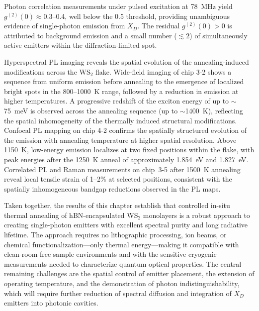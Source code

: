 Photon correlation measurements under pulsed excitation at 78~MHz yield $g^{(2)}(0) \approx 0.3$--0.4, well below the 0.5 threshold, providing unambiguous evidence of single-photon emission from $X_D$. The residual $g^{(2)}(0) > 0$ is attributed to background emission and a small number ($\lesssim 2$) of simultaneously active emitters within the diffraction-limited spot.

Hyperspectral PL imaging reveals the spatial evolution of the annealing-induced modifications across the WS$_2$ flake. Wide-field imaging of chip 3-2 shows a sequence from uniform emission before annealing to the emergence of localized bright spots in the 800--1000~K range, followed by a reduction in emission at higher temperatures. A progressive redshift of the exciton energy of up to $\sim$75~meV is observed across the annealing sequence (up to $\sim$1400~K), reflecting the spatial inhomogeneity of the thermally induced structural modifications. Confocal PL mapping on chip 4-2 confirms the spatially structured evolution of the emission with annealing temperature at higher spatial resolution. Above 1150~K, low-energy emission localizes at two fixed positions within the flake, with peak energies after the 1250~K anneal of approximately 1.854~eV and 1.827~eV. Correlated PL and Raman measurements on chip~3-5 after 1500~K annealing reveal local tensile strain of 1--2\% at selected positions, consistent with the spatially inhomogeneous bandgap reductions observed in the PL maps.

Taken together, the results of this chapter establish that controlled in-situ thermal annealing of hBN-encapsulated WS$_2$ monolayers is a robust approach to creating single-photon emitters with excellent spectral purity and long radiative lifetime. The approach requires no lithographic processing, ion beams, or chemical functionalization---only thermal energy---making it compatible with clean-room-free sample environments and with the sensitive cryogenic measurements needed to characterize quantum optical properties. The central remaining challenges are the spatial control of emitter placement, the extension of operating temperature, and the demonstration of photon indistinguishability, which will require further reduction of spectral diffusion and integration of $X_D$ emitters into photonic cavities.




\printbibliography[heading=subbibintoc]
% 
% 
